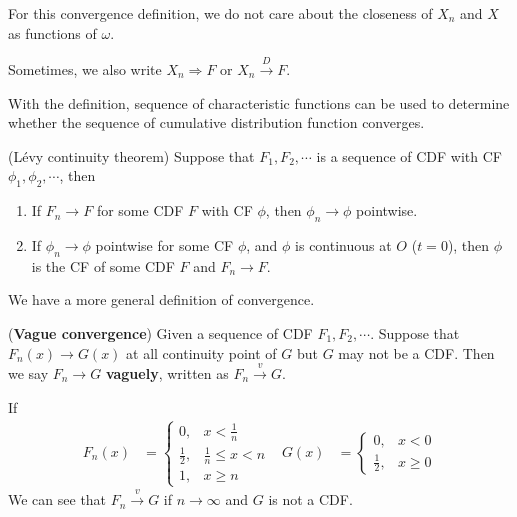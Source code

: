 \documentclass{huhtakm-template-book}
\begin{document}
    \begin{rem}
        For this convergence definition, we do not care about the closeness of $X_{n}$ and $X$ as functions of $\omega$.
    \end{rem}
    \begin{rem}
        Sometimes, we also write $X_{n}\Rightarrow F$ or $X_{n}\xrightarrow{D}F$.
    \end{rem}
    With the definition, sequence of characteristic functions can be used to determine whether the sequence of cumulative distribution function converges.
    \begin{thm}(L\'evy continuity theorem)
        \label{Chapter 5 Theorem Levy continuity theorem}
        Suppose that $F_{1},F_{2},\cdots$ is a sequence of CDF with CF $\phi_{1},\phi_{2},\cdots$, then
        \begin{enumerate}
            \item If $F_{n}\to F$ for some CDF $F$ with CF $\phi$, then $\phi_{n}\to\phi$ pointwise.
            \item If $\phi_{n}\to\phi$ pointwise for some CF $\phi$, and $\phi$ is continuous at $O$ ($t=0$), then $\phi$ is the CF of some CDF $F$ and $F_{n}\to F$.
        \end{enumerate}
    \end{thm}
    We have a more general definition of convergence.
    \begin{defn}(\textbf{Vague convergence})
        Given a sequence of CDF $F_{1},F_{2},\cdots$. Suppose that $F_{n}(x)\to G(x)$ at all continuity point of $G$ but $G$ may not be a CDF. Then we say $F_{n}\to G$ \textbf{vaguely}, written as $F_{n}\xrightarrow{v}G$.
    \end{defn}
    \begin{eg}
    If
        \begin{align*}
            F_{n}(x)&=\begin{cases}
                0, &x<\frac{1}{n}\\
                \frac{1}{2}, &\frac{1}{n}\leq x<n\\
                1, &x\geq n
            \end{cases} & G(x)&=\begin{cases}
                0, &x<0\\
                \frac{1}{2}, &x\geq 0
            \end{cases}
        \end{align*}
        We can see that $F_{n}\xrightarrow{v}G$ if $n\to\infty$ and $G$ is not a CDF.
    \end{eg}
\end{document}

